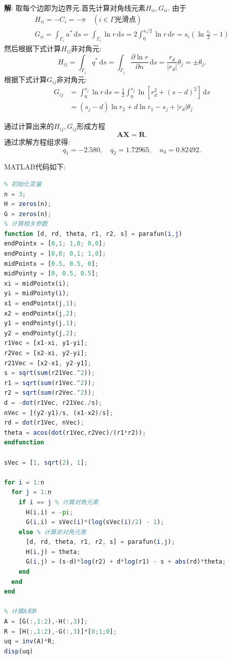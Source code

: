 \documentclass{ctexart}
\newenvironment{answer}{\textbf{解}:}{
\vspace{0.5cm}
}
\newcommand\diff{\,\mathrm{d}}
\begin{document}
\begin{answer}
取每个边即为边界元.首先计算对角线元素$H_{ii}, G_{ii}$. 由于
\begin{gather}
  H_{ii} = - C_i = -\pi \quad (i \in \varGamma\text{光滑点}) \\
  G_{ii} = \int_{\varGamma_i}u^{*} \diff s = \int_{\varGamma_i} \ln r \diff s = 2\int_0^{s_i/2} \ln r \diff r = s_i (\ln \frac{s_i}{2} - 1)
\end{gather}
然后根据下式计算$H_{ij}$非对角元:
\begin{equation}
  H_{ij} = \int_{\varGamma_j}q^{*}\diff s = \int_{\varGamma_j} \frac{\partial \ln r}{\partial n} \diff s = \frac{r_d}{|r_d|} \theta_j = \pm \theta_j.
\end{equation}
根据下式计算$G_{ij}$非对角元:
\begin{equation}
  \begin{split}
    G_{ij} &= \int_{0}^{s_j} \ln r \diff s = \frac{1}{2} \int_0^{s_j} \ln [r_d^2 + (s-d)^2] \diff s \\
     &= (s_j - d)\ln r_2 + d \ln r_1 - s_j + |r_d| \theta_j
  \end{split}
\end{equation}

通过计算出来的$H_{ij}, G_{ij}$形成方程
\begin{equation}
  \bm{A}\bm{X} = \bm{R}.
\end{equation}
通过求解方程组求得:
\begin{equation}
  q_1 = -2.580, \quad q_2 = 1.72965, \quad u_3 = 0.82492.
\end{equation}

MATLAB代码如下:
\begin{lstlisting}[language=Octave]
% 第四题 边界元法求解泊松方程的混合边值问题
% 初始化变量
n = 3;
H = zeros(n);
G = zeros(n);
% 计算相关参数
function [d, rd, theta, r1, r2, s] = parafun(i,j)
endPointx = [0,1; 1,0; 0,0];
endPointy = [0,0; 0,1; 1,0];
midPointx = [0.5, 0.5, 0];
midPointy = [0, 0.5, 0.5];
xi = midPointx(i);
yi = midPointy(i);
x1 = endPointx(j,1);
x2 = endPointx(j,2);
y1 = endPointy(j,1);
y2 = endPointy(j,2);
r1Vec = [x1-xi, y1-yi];
r2Vec = [x2-xi, y2-yi];
r21Vec = [x2-x1, y2-y1];
s = sqrt(sum(r21Vec.^2));
r1 = sqrt(sum(r1Vec.^2));
r2 = sqrt(sum(r2Vec.^2));
d = -dot(r1Vec, r21Vec./s);
nVec = [(y2-y1)/s, (x1-x2)/s];
rd = dot(r1Vec, nVec);
theta = acos(dot(r1Vec,r2Vec)/(r1*r2));
endfunction

sVec = [1, sqrt(2), 1];

for i = 1:n
  for j = 1:n
    if i == j % 计算对角元素
      H(i,i) = -pi;
      G(i,i) = sVec(i)*(log(sVec(i)/2) - 1);
    else % 计算非对角元素
      [d, rd, theta, r1, r2, s] = parafun(i,j);
      H(i,j) = theta;
      G(i,j) = (s-d)*log(r2) + d*log(r1) - s + abs(rd)*theta;
    end
  end
end

% 计算A和R
A = [G(:,1:2),-H(:,3)];
R = [H(:,1:2),-G(:,3)]*[0;1;0];
uq = inv(A)*R;
disp(uq)
\end{lstlisting}
\end{answer}
\end{document}
